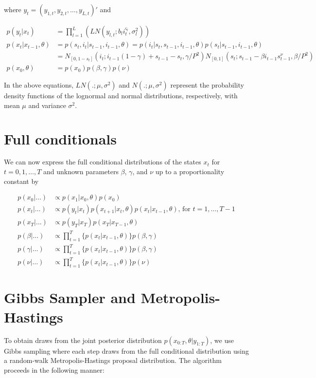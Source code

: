\documentclass{article}
\begin{document}
\noindent where $y_t = (y_{1,t},y_{2,t},\ldots,y_{L,t})'$ and

\begin{align*}
p(y_t|x_t) &= \prod_{l=1}^L \left(LN(y_{l,t};b_li_t^{\varsigma_l},\sigma_l^2)\right) \\
p(x_t|x_{t-1},\theta) &= p(s_t,i_t|s_{t-1},i_{t-1},\theta) = p(i_t|s_t,s_{t-1},i_{t-1},\theta)p(s_t|s_{t-1},i_{t-1},\theta) \\
&= N_{[0,1-s_t]}(i_t;i_{t-1}(1 - \gamma) + s_{t-1} - s_t, \gamma / P^2)N_{[0,1]}(s_t; s_{t-1} - \beta i_{t-1}s^{\nu}_{t-1}, \beta / P^2) \\
p(x_0,\theta) &= p(x_0)p(\beta, \gamma)p(\nu)
\end{align*}

\noindent In the above equations, $LN(.;\mu,\sigma^2)$ and $N(.;\mu,\sigma^2)$ represent the probability density functions of the lognormal and normal distributions, respectively, with mean $\mu$ and variance $\sigma^2$.

\section{Full conditionals} \label{sec:fullcond}
We can now express the full conditional distributions of the states $x_t$ for $t = 0, 1, \ldots, T$ and unknown parameters $\beta$, $\gamma$, and $\nu$ up to a proportionality constant by

\begin{align*}
p(x_0|\hdots) &\propto p(x_1|x_0,\theta)p(x_0) \\
p(x_t|\hdots) &\propto p(y_t|x_t)p(x_{t+1}|x_t,\theta)p(x_t|x_{t-1},\theta) \mbox{, for } t = 1,\ldots,T-1 \\
p(x_T|\hdots) &\propto p(y_T|x_T)p(x_T|x_{T-1},\theta) \\
p(\beta|\hdots) &\propto \prod_{t=1}^T \{p(x_t|x_{t-1},\theta)\}p(\beta, \gamma) \\
p(\gamma|\hdots) &\propto \prod_{t=1}^T \{p(x_t|x_{t-1},\theta)\}p(\beta, \gamma) \\
p(\nu|\hdots) &\propto \prod_{t=1}^T \{p(x_t|x_{t-1},\theta)\}p(\nu)
\end{align*}

\section{Gibbs Sampler and Metropolis-Hastings} \label{sec:gibbs}

To obtain draws from the joint posterior distribution $p(x_{0:T},\theta|y_{1:T})$, we use Gibbs sampling where each step draws from the full conditional distribution using a random-walk Metropolis-Hastings proposal distribution. The algorithm proceeds in the following manner:
\end{document}
